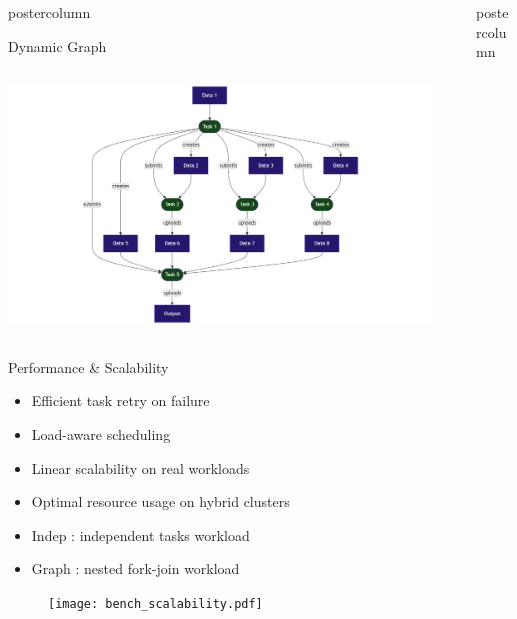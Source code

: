 \begin{frame}[fragile]
\begin{columns}[T]
\begin{column}{.49\textwidth}
\begin{beamercolorbox}[center,wd=\textwidth]{postercolumn}
\begin{minipage}[T]{.96\textwidth}
\begin{block}{Dynamic Graph}
\begin{columns}[T]
\begin{column}{0.65\textwidth}
                \includegraphics[width=0.95\textwidth]{mermaid-dynamic-part2.png}
            \end{column}
            \end{columns}
            \end{block}

            \begin{block}{Performance \& Scalability}
            \begin{itemize}
                \item Efficient task retry on failure
                \item Load-aware scheduling
                \item Linear scalability on real workloads
                \item Optimal resource usage on hybrid clusters
                \item Indep : independent tasks workload
                \item  Graph : nested fork-join workload
            \end{itemize}
            \begin{figure}
              \centering
              \texttt{[image: bench\_scalability.pdf]}
            \end{figure}
            \end{block}

        \end{minipage}
      \end{beamercolorbox}
    \end{column}
    \begin{column}{.49\textwidth}
      \begin{beamercolorbox}[center,wd=\textwidth]{postercolumn}
        \begin{minipage}[T]{.96\textwidth}
            

\end{minipage}
\end{beamercolorbox}
\end{column}
\end{columns}
\end{frame}
